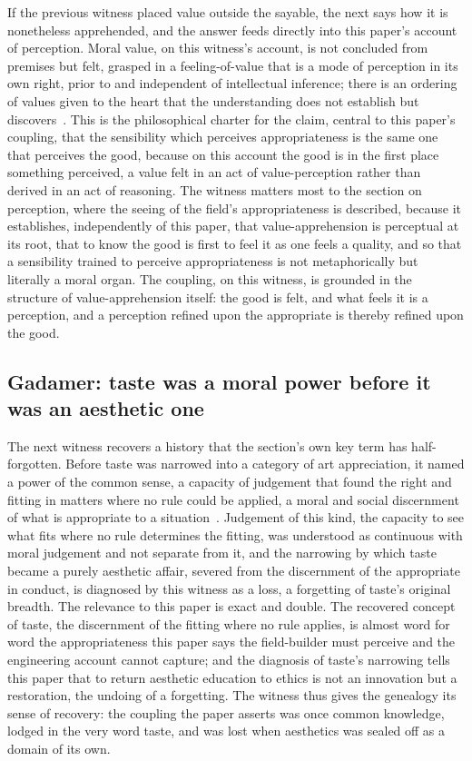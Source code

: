 If the previous witness placed value outside the sayable, the next says how it is nonetheless apprehended, and the answer feeds directly into this paper's account of perception. Moral value, on this witness's account, is not concluded from premises but felt, grasped in a feeling-of-value that is a mode of perception in its own right, prior to and independent of intellectual inference; there is an ordering of values given to the heart that the understanding does not establish but discovers~\parencite{scheler_formalism}. This is the philosophical charter for the claim, central to this paper's coupling, that the sensibility which perceives appropriateness is the same one that perceives the good, because on this account the good is in the first place something perceived, a value felt in an act of value-perception rather than derived in an act of reasoning. The witness matters most to the section on perception, where the seeing of the field's appropriateness is described, because it establishes, independently of this paper, that value-apprehension is perceptual at its root, that to know the good is first to feel it as one feels a quality, and so that a sensibility trained to perceive appropriateness is not metaphorically but literally a moral organ. The coupling, on this witness, is grounded in the structure of value-apprehension itself: the good is felt, and what feels it is a perception, and a perception refined upon the appropriate is thereby refined upon the good.

\subsection{Gadamer: taste was a moral power before it was an aesthetic one}
\label{p22:sub:gen-gadamer}

The next witness recovers a history that the section's own key term has half-forgotten. Before taste was narrowed into a category of art appreciation, it named a power of the common sense, a capacity of judgement that found the right and fitting in matters where no rule could be applied, a moral and social discernment of what is appropriate to a situation~\parencite{gadamer_truth}. Judgement of this kind, the capacity to see what fits where no rule determines the fitting, was understood as continuous with moral judgement and not separate from it, and the narrowing by which taste became a purely aesthetic affair, severed from the discernment of the appropriate in conduct, is diagnosed by this witness as a loss, a forgetting of taste's original breadth. The relevance to this paper is exact and double. The recovered concept of taste, the discernment of the fitting where no rule applies, is almost word for word the appropriateness this paper says the field-builder must perceive and the engineering account cannot capture; and the diagnosis of taste's narrowing tells this paper that to return aesthetic education to ethics is not an innovation but a restoration, the undoing of a forgetting. The witness thus gives the genealogy its sense of recovery: the coupling the paper asserts was once common knowledge, lodged in the very word taste, and was lost when aesthetics was sealed off as a domain of its own.

